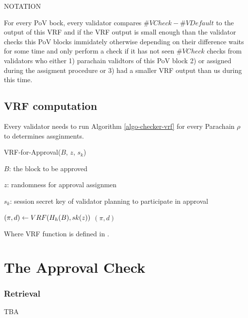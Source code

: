 NOTATION

For every PoV bock, every validator compares $\#VCheck - \#VDefault$ to the output of this VRF and if the VRF output is small enough than the validator checks this PoV blocks immidately otherwise depending on their difference waits for some time and only perform a check if it has not seen $\#VCheck$ checks from validators who either 1) parachain validtors of this PoV block 2) or assigned during the assigment procedure or 3) had a smaller VRF output than us during this time.


\subsection{VRF computation}

Every validator needs to run Algorithm \ref{algo-checker-vrf} for every Parachain $\rho$ to determines assginments.

\begin{algorithm}
  \caption[VRF-for-Approval]{\sc VRF-for-Approval($B$, $z$, $s_k$)}
  \label{algo-checker-vrf}
  \begin{algorithmic}[1]
  \Require

    $B$: the block to be approved 

    $z$: randomness for approval assignmen

    $s_k$: session secret key of validator planning to participate in approval

    \State $(\pi, d) \leftarrow {\sc VRF}(H_h(B),sk(z))$
    \State \Return $(\pi,d)$
  \end{algorithmic}
\end{algorithm}

Where {\sc VRF} function is defined in \cite{polkadot-crypto-spec}.

\section{The Approval Check}
\subsubsection{Retrieval}
\label{sect-retrieval-of-erasure-pieces}
TBA


